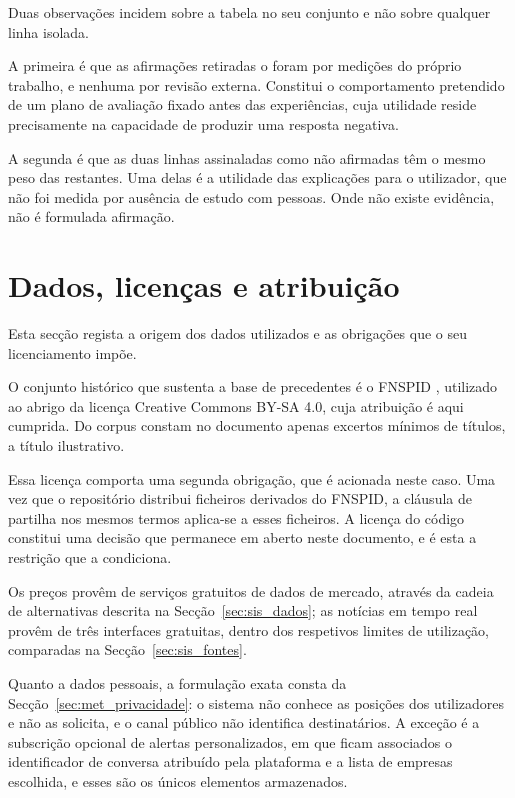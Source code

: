Duas observações incidem sobre a tabela no seu conjunto e não sobre qualquer linha isolada.

A primeira é que as afirmações retiradas o foram por medições do próprio trabalho, e nenhuma por
revisão externa. Constitui o comportamento pretendido de um plano de avaliação fixado antes das
experiências, cuja utilidade reside precisamente na capacidade de produzir uma resposta negativa.

A segunda é que as duas linhas assinaladas como não afirmadas têm o mesmo peso das restantes. Uma
delas é a utilidade das explicações para o utilizador, que não foi medida por ausência de estudo com
pessoas. Onde não existe evidência, não é formulada afirmação.

\section{Dados, licenças e atribuição}
\label{sec:ap_dados}

Esta secção regista a origem dos dados utilizados e as obrigações que o seu licenciamento impõe.

O conjunto histórico que sustenta a base de precedentes é o \gls{FNSPID}
\autocite{dong2024fnspid}, utilizado ao abrigo da licença Creative Commons BY-SA 4.0, cuja
atribuição é aqui cumprida. Do corpus constam no documento apenas excertos mínimos de títulos, a
título ilustrativo.

Essa licença comporta uma segunda obrigação, que é acionada neste caso. Uma vez que o repositório
distribui ficheiros derivados do \gls{FNSPID}, a cláusula de partilha nos mesmos termos aplica-se a
esses ficheiros. A licença do código constitui uma decisão que permanece em aberto neste documento,
e é esta a restrição que a condiciona.

Os preços provêm de serviços gratuitos de dados de mercado, através da cadeia de alternativas
descrita na Secção~\ref{sec:sis_dados}; as notícias em tempo real provêm de três interfaces
gratuitas, dentro dos respetivos limites de utilização, comparadas na Secção~\ref{sec:sis_fontes}.

Quanto a dados pessoais, a formulação exata consta da Secção~\ref{sec:met_privacidade}: o sistema
não conhece as posições dos utilizadores e não as solicita, e o canal público não identifica
destinatários. A exceção é a subscrição opcional de alertas personalizados, em que ficam associados
o identificador de conversa atribuído pela plataforma e a lista de empresas escolhida, e esses são
os únicos elementos armazenados.


